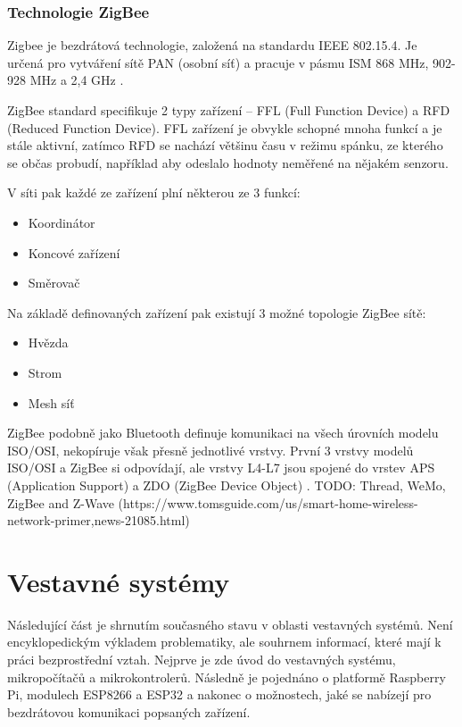 \subsection*{Technologie ZigBee}
Zigbee je bezdrátová technologie, založená na standardu IEEE 802.15.4. Je určená pro vytváření sítě PAN (osobní síť) a pracuje v pásmu ISM 868 MHz, 902-928 MHz a 2,4 GHz \cite{4technologie}. 

ZigBee standard specifikuje 2 typy zařízení – FFL (Full Function Device) a RFD (Reduced Function Device). FFL zařízení je obvykle schopné mnoha funkcí a je stále aktivní, zatímco RFD se nachází většinu času v režimu spánku, ze kterého se občas probudí, například aby odeslalo hodnoty neměřené na nějakém senzoru.

V síti pak každé ze zařízení plní některou ze 3 funkcí:
\begin{itemize}
    \item Koordinátor
    \item Koncové zařízení
    \item Směrovač
\end{itemize}

Na základě definovaných zařízení pak existují 3 možné topologie ZigBee sítě:
\begin{itemize}
    \item Hvězda
    \item Strom
    \item Mesh síť \cite{HandsOnZigBee}
\end{itemize}

ZigBee podobně jako Bluetooth definuje komunikaci na všech úrovních modelu ISO/OSI, nekopíruje však přesně jednotlivé vrstvy. První 3 vrstvy modelů ISO/OSI a ZigBee si odpovídají, ale vrstvy L4-L7 jsou spojené do vrstev APS (Application Support) a ZDO (ZigBee Device Object) \cite{ZigbeeWirelessNetworking}.
TODO: Thread, WeMo, ZigBee and Z-Wave (https://www.tomsguide.com/us/smart-home-wireless-network-primer,news-21085.html)

\chapter{Vestavné systémy}
\label{vestavne-systemy}
Následující část je shrnutím současného stavu v oblasti vestavných systémů. Není encyklopedickým výkladem problematiky, ale souhrnem informací, které mají k práci bezprostřední vztah. Nejprve je zde úvod do vestavných systému, mikropočítačů a mikrokontrolerů. Následně je pojednáno o platformě Raspberry Pi, modulech ESP8266 a ESP32 a nakonec o možnostech, jaké se nabízejí pro bezdrátovou komunikaci popsaných zařízení.

